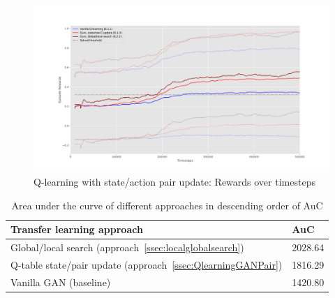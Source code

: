 \begin{figure}[H]
\centering
\includegraphics[width=15cm]{Figures/globallocalsearchBench}
\caption{Q-learning with state/action pair update: Rewards over timesteps}
\label{fig:globallocalsearchBench}
\end{figure}

\begin{table}[H]
\centering
\begin{tabular}{@{}ll@{}}
\toprule
Transfer learning approach & AuC     \\ \midrule
Global/local search (approach~\ref{ssec:localglobalsearch})  & 2028.64 \\
Q-table state/pair update (approach~\ref{ssec:QlearningGANPair})  & 1816.29 \\
Vanilla GAN (baseline)     & 1420.80 \\
\end{tabular}
\caption{Area under the curve of different approaches in descending order of AuC}
\label{tab:aucgenerator}
\end{table}
